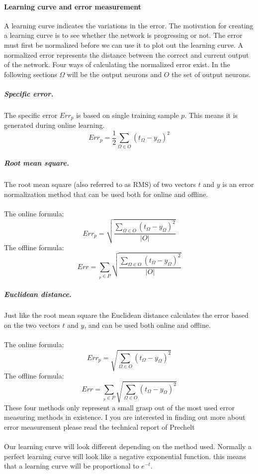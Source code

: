 \documentclass[pdftex,a4paper,12pt,twoside]{report}
\theoremstyle{plain} \newtheorem{theorem}{Theorem} \newtheorem{proposition}{Proposition} \newtheorem{lemma}{Lemma} \newtheorem*{corollary}{Corollary}
\theoremstyle{definition} \newtheorem{definition}{Definition} \newtheorem{conjecture}{Conjecture} \newtheorem*{example}{Example} \newtheorem{algorithm}{Algorithm}
\theoremstyle{remark} \newtheorem*{remark}{Remark} \newtheorem*{note}{Note} \newtheorem{case}{Case}
\begin{document}
\paragraph{Learning curve and error measurement}
A learning curve indicates the variations in the error. The motivation for creating a learning curve is to see whether the network is progressing or not. The error must first be normalized before we can use it to plot out the learning curve. A normalized error represents the distance between the correct and current output of the network. Four ways of calculating the normalized error exist. In the following sections $\Omega$ will be the output neurons and $O$ the set of output neurons.
\subparagraph{Specific error.}
The specific error $Err_p$ is based on single training sample $p$. This means it is generated during online learning.
\begin{equation}
Err_p = \frac{1}{2} \sum_{\Omega \in O}(t_\Omega - y_\Omega)^2
\end{equation}
\subparagraph{Root mean square.}
The root mean square (also referred to as RMS) of two vectors $t$ and $y$ is an error normalization method that can be used both for online and offline.\\\\
The online formula:
\begin{equation}
Err_p =  \sqrt{\frac{\sum_{\Omega \in O}(t_\Omega - y_\Omega)^2}{|O|}}
\end{equation}
The offline formula:
\begin{equation}
Err = \sum_{_{p} \in P}\sqrt{\frac{\sum_{\Omega \in O}(t_\Omega - y_\Omega)^2}{|O|}}
\end{equation}
\subparagraph{Euclidean distance.}
Just like the root mean square the Euclidean distance calculates the error based on the two vectors $t$ and $y$, and can be used both online and offline.\\\\
The online formula:
\begin{equation}
Err_p =  \sqrt{{\sum_{\Omega \in O}(t_\Omega - y_\Omega)^2}}
\end{equation}
The offline formula:
\begin{equation}
Err = \sum_{_{p} \in P}\sqrt{{\sum_{\Omega \in O}(t_\Omega - y_\Omega)^2}}
\end{equation}
These four methods only represent a small grasp out of the most used error measuring methods in existence. I you are interested in finding out more about error measurement please read the technical report of Prechelt \citep{Prechelt1994}\\\\Our learning curve will look different depending on the method used. Normally a perfect learning curve will look like a negative exponential function. this means that a learning curve will be proportional to $e^{-t}$.
\end{document}

